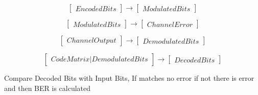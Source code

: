 \documentclass[12pt,a4paper,onecolumn]{article}
\begin{document}
\begin{equation*}
\begin{bmatrix}
Encoded Bits 
\end{bmatrix} 
\to  
\begin{bmatrix}
Modulated Bits
\end{bmatrix}
\end{equation*}

\begin{equation*}
\begin{bmatrix}
Modulated Bits
\end{bmatrix} 
\to  
\begin{bmatrix}
Channel Error 
\end{bmatrix} 
\end{equation*}

\begin{equation*}
\begin{bmatrix}
Channel Output
\end{bmatrix} 
\to  
\begin{bmatrix}
Demodulated Bits
\end{bmatrix} 
\end{equation*}

\begin{equation*}
\begin{bmatrix}
Code Matrix \vert Demodulated Bits
\end{bmatrix}
\to  
\begin{bmatrix}
Decoded Bits
\end{bmatrix}
\end{equation*}

Compare Decoded Bits with Input Bits, If matches no error if not there is error and then BER is calculated
\end{document}
